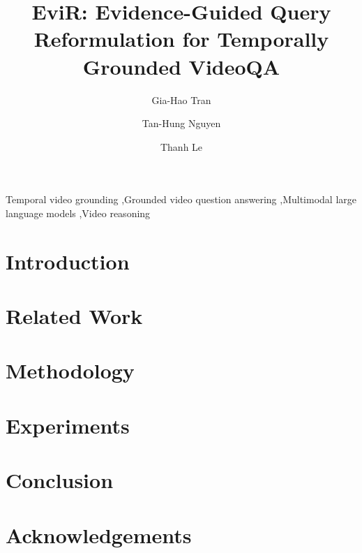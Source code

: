 \documentclass[3p,times,procedia]{elsarticle}
\begin{document}
\begin{frontmatter}

\title{EviR: Evidence-Guided Query Reformulation for Temporally Grounded VideoQA}


\author[a,b]{Gia-Hao Tran}


\author[a,b]{Tan-Hung Nguyen}




\author[a,b]{Thanh Le}

\address[a]{Faculty of Information Technology, University of Science, Ho Chi Minh City, Vietnam}
\address[b]{Vietnam National University, Ho Chi Minh City, Vietnam}


\begin{abstract}

\end{abstract}

\begin{keyword}
Temporal video grounding \sep Grounded video question answering \sep Multimodal large language models \sep Video reasoning
\end{keyword}

\end{frontmatter}

\section{Introduction}
\label{sec:introduction}


\section{Related Work}
\label{sec:related_work}


\section{Methodology}
\label{sec:method}


\section{Experiments}
\label{sec:experiments}


\section{Conclusion}
\label{sec:conclusion}


\section*{Acknowledgements}




\end{document}
